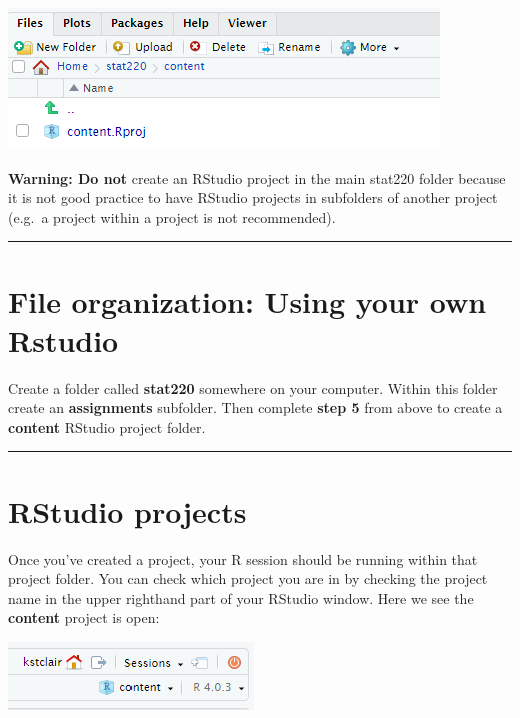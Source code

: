 \documentclass[
]{book}
\begin{document}
\includegraphics{img/maize_Rproj.png}

\textbf{Warning: Do not} create an RStudio project in the main stat220 folder
because it is not good practice to have RStudio projects in subfolders
of another project (e.g.~a project within a project is not recommended).

\begin{center}\rule{0.5\linewidth}{0.5pt}\end{center}

\hypertarget{file-organization-using-your-own-rstudio}{%
\section{File organization: Using your own Rstudio}\label{file-organization-using-your-own-rstudio}}

Create a folder called \textbf{stat220} somewhere on your computer. Within
this folder create an \textbf{assignments} subfolder. Then complete \textbf{step
5} from above to create a \textbf{content} RStudio project folder.

\begin{center}\rule{0.5\linewidth}{0.5pt}\end{center}

\hypertarget{rstudio-projects}{%
\section{RStudio projects}\label{rstudio-projects}}

Once you've created a project, your R session should be running within
that project folder. You can check which project you are in by checking
the project name in the upper righthand part of your RStudio window.
Here we see the \textbf{content} project is open:

\includegraphics{img/maize_content.png}
\end{document}
